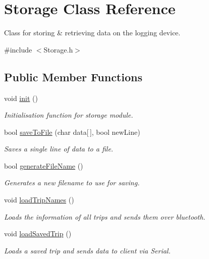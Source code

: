 \hypertarget{class_storage}{}\section{Storage Class Reference}
\label{class_storage}


Class for storing \& retrieving data on the logging device.  




{\ttfamily \#include $<$Storage.\+h$>$}

\subsection*{Public Member Functions}
\begin{DoxyCompactItemize}
\item 
void \hyperlink{class_storage_a98b01eb20a64a4bf4127685147f7f6f1}{init} ()
\begin{DoxyCompactList}\small\item\em Initialisation function for storage module. \end{DoxyCompactList}\item 
bool \hyperlink{class_storage_a044a17325b2917afca49aa19ddb488f6}{save\+To\+File} (char data\mbox{[}$\,$\mbox{]}, bool new\+Line)
\begin{DoxyCompactList}\small\item\em Saves a single line of data to a file. \end{DoxyCompactList}\item 
bool \hyperlink{class_storage_a571ce9630665d9407ffbaeff55c47b0a}{generate\+File\+Name} ()
\begin{DoxyCompactList}\small\item\em Generates a new filename to use for saving. \end{DoxyCompactList}\item 
void \hyperlink{class_storage_a4831b2e8ecfa22da6971f5a8690cc4e3}{load\+Trip\+Names} ()
\begin{DoxyCompactList}\small\item\em Loads the information of all trips and sends them over bluetooth. \end{DoxyCompactList}\item 
void \hyperlink{class_storage_af56ca8289ed925300e3385114c561eec}{load\+Saved\+Trip} ()
\begin{DoxyCompactList}\small\item\em Loads a saved trip and sends data to client via Serial. \end{DoxyCompactList}\end{DoxyCompactItemize}
